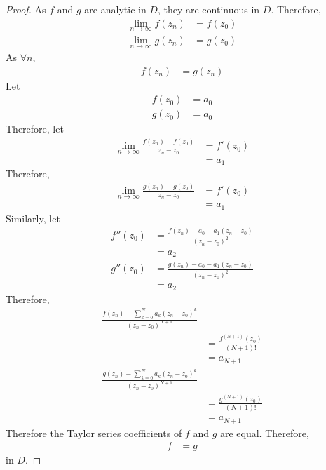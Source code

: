 \documentclass[titlepage, fleqn, a4paper, 12pt, twoside]{article}
\theoremstyle{definition}
\theoremstyle{theorem}
\begin{document}
\begin{proof}
	As $f$ and $g$ are analytic in $D$, they are continuous in $D$.
	Therefore,
	\begin{align*}
		\lim\limits_{n \to \infty} f(z_n) & = f(z_0) \\
		\lim\limits_{n \to \infty} g(z_n) & = g(z_0)
	\end{align*}
	As $\forall n$,
	\begin{align*}
		f(z_n) & = g(z_n)
	\end{align*}
	Let
	\begin{align*}
		f(z_0) & = a_0 \\
		g(z_0) & = a_0
	\end{align*}
	Therefore, let
	\begin{align*}
		\lim\limits_{n \to \infty} \frac{f(z_n) - f(z_0)}{z_n - z_0} & = f'(z_0) \\
                                                                             & = a_1
	\end{align*}
	Therefore,
	\begin{align*}
		\lim\limits_{n \to \infty} \frac{g(z_n) - g(z_0)}{z_n - z_0} & = f'(z_0) \\
                                                                             & = a_1
	\end{align*}
	Similarly, let
	\begin{align*}
		f''(z_0) & = \frac{f(z_n) - a_0 - a_1 (z_n - z_0)}{(z_n - z_0)^2} \\
                         & = a_2                                                  \\
		g''(z_0) & = \frac{g(z_n) - a_0 - a_1 (z_n - z_0)}{(z_n - z_0)^2} \\
                         & = a_2
	\end{align*}
	Therefore,
	\begin{align*}
		\frac{f(z_n) - \sum\limits_{k = 0}^{N} a_k (z_n - z_0)^k}{(z_n - z_0)^{N + 1}} \\
                                                                                                & = \frac{f^{(N + 1)}(z_0)}{(N + 1)!} \\
                                                                                                & = a_{N + 1}                         \\
		\frac{g(z_n) - \sum\limits_{k = 0}^{N} a_k (z_n - z_0)^k}{(z_n - z_0)^{N + 1}} \\
                                                                                                & = \frac{g^{(N + 1)}(z_0)}{(N + 1)!} \\
                                                                                                & = a_{N + 1}
	\end{align*}
	Therefore the Taylor series coefficients of $f$ and $g$ are equal.
	Therefore,
	\begin{align*}
		f & = g
	\end{align*}
	in $D$.
\end{proof}
\end{document}
